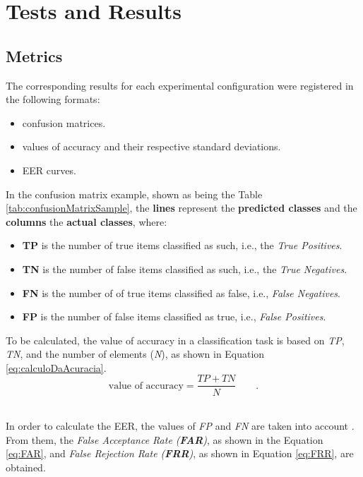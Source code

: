 \section{Tests and Results}
	\label{sec:testsResults}
	\subsection{Metrics}
		\par The corresponding results for each experimental configuration were registered in the following formats:
		\begin{itemize}
			\item{} confusion matrices.
			\item{} values of accuracy and their respective standard deviations.
			\item{} EER curves.
		\end{itemize}
		\par In the confusion matrix example, shown as being the Table \ref{tab:confusionMatrixSample}, the \textbf{lines} represent the \textbf{predicted classes} and the \textbf{columns} the \textbf{actual classes}, where:
		\begin{itemize}
			\item{}\textbf{TP} is the number of true items classified as such, i.e., the \textit{True Positives}.
			\item{}\textbf{TN} is the number of false items classified as such, i.e., the \textit{True Negatives}.
			\item{}\textbf{FN} is the number of of true items classified as false, i.e., \textit{False Negatives}.
			\item{}\textbf{FP} is the number of false items classified as true, i.e., \textit{False Positives}.
		\end{itemize}
		
		To be calculated, the value of accuracy in a classification task is based on \textit{TP}, \textit{TN}, and the number of elements (\textit{N}), as shown in Equation \ref{eq:calculoDaAcuracia}.
		\\
		\begin{equation}
			\text{value of accuracy} = \dfrac{TP + TN}{N} \qquad.
			\label{eq:calculoDaAcuracia}
		\end{equation}
		\\
		\par In order to calculate the EER, the values of \textit{FP} and \textit{FN} are taken into account \cite{ghazali2018recent}. From them, the \textit{False Acceptance Rate (\textbf{FAR})}, as shown in the Equation \ref{eq:FAR}, and \textit{False Rejection Rate (\textbf{FRR})}, as shown in Equation \ref{eq:FRR}, are obtained.
